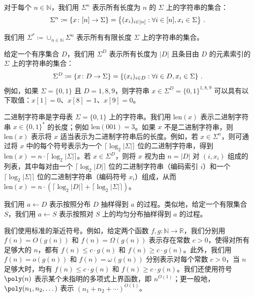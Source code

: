 \documentclass[american,singlepageview]{snargs-book-zh}
\renewcommand{\enspace}{\ensuremath{\thinspace}}
\newcommand{\Bits}{\{0,1\}}
\newcommand{\DefineEqual}{\coloneqq}
\newcommand{\ceil}[1]{\lceil{#1}\rceil}
\newcommand{\Cardinality}[1]{\left|{#1}\right|}
\newcommand{\BitSize}[1]{\mathrm{len}(#1)}
\newcommand{\Naturals}{\mathbb{N}}
\newcommand{\Reals}{\mathbb{R}}
\newcommand{\ProtoAlphabet}{\Sigma}
\begin{document}
对于每个 $n \in \Naturals$，我们用 $\ProtoAlphabet^{n}$ 表示所有长度为 $n$ 的 $\ProtoAlphabet$ 上的字符串的集合：
\begin{equation*}
\ProtoAlphabet^{n}
\DefineEqual
\left\{
x \colon [n] \to \ProtoAlphabet
\right\}
=
\left\{
(x_{i})_{i \in [n]} : \forall i \in [n], x_{i} \in \ProtoAlphabet
\right\}
\enspace.
\end{equation*}

我们用 $\ProtoAlphabet^{*} \DefineEqual \cup_{n \in \Naturals} \ProtoAlphabet^{n}$ 表示所有有限长度 $\ProtoAlphabet$ 上的字符串的集合。

给定一个有序集合 $D$，我们用 $\ProtoAlphabet^{D}$ 表示所有长度为 $\Cardinality{D}$ 且条目由 $D$ 的元素索引的 $\ProtoAlphabet$ 上的字符串的集合：
\begin{equation*}
\ProtoAlphabet^{D}
\DefineEqual
\left\{
x \colon D \to \ProtoAlphabet
\right\}
=
\left\{
(x_{i})_{i \in D} : \forall i \in D, x_{i} \in \ProtoAlphabet
\right\}
\enspace.
\end{equation*}
例如，如果 $\ProtoAlphabet = \Bits$ 且 $D = {1,8,9}$，则字符串 $x \in \ProtoAlphabet^{D}=\Bits^{{1,8,9}}$ 可以具有以下取值：$x[1]=0$、$x[8]=1$、$x[9]=0$。

二进制字符串是字母表 $\ProtoAlphabet=\Bits$ 上的字符串。我们用 $\BitSize{x}$ 表示二进制字符串 $x\in\Bits^{*}$ 的长度；例如 $\BitSize{001}=3$。如果 $x$ 不是二进制字符串，则 $\BitSize{x}$ 表示将 $x$ 适当表示为二进制字符串后的长度。例如，若 $x\in\ProtoAlphabet^{n}$，则可通过将 $x$ 中的每个符号表示为一个 $\ceil{\log_{2}\Cardinality{\ProtoAlphabet}}$ 位的二进制字符串，得到 $\BitSize{x} = n \cdot \ceil{\log_{2}\Cardinality{\ProtoAlphabet}}$。若 $x\in\ProtoAlphabet^{D}$，则将 $x$ 视为由 $n=\Cardinality{D}$ 对 $(i,x_{i})$ 组成的列表，其中每对由一个 $\ceil{\log_{2}\Cardinality{D}}$ 位的二进制字符串（编码索引 $i$）和一个 $\ceil{\log_{2}\Cardinality{\ProtoAlphabet}}$ 位的二进制字符串（编码符号 $x_{i}$）组成，从而 $\BitSize{x} = n \cdot (\ceil{\log_{2}\Cardinality{D}} + \ceil{\log_{2}\Cardinality{\ProtoAlphabet}})$。

我们用 $a \gets D$ 表示按照分布 $D$ 抽样得到 $a$ 的过程。类似地，给定一个有限集合 $S$，我们用 $a \gets S$ 表示按照对 $S$ 上的均匀分布抽样得到 $a$ 的过程。

我们使用标准的渐近符号。例如，给定两个函数 $f,g \colon \Naturals \to \Reals$，我们分别用 $f(n)=O(g(n))$ 和 $f(n)=\Omega(g(n))$ 表示存在常数 $c>0$，使得对所有足够大的 $n$，都有 $f(n)\le c\cdot g(n)$ 和 $f(n)\ge c\cdot g(n)$。此外，我们用 $f(n)=o(g(n))$ 和 $f(n)=\omega(g(n))$ 分别表示对每个常数 $c>0$，当 $n$ 足够大时，均有 $f(n)\le c\cdot g(n)$ 和 $f(n)\ge c\cdot g(n)$。我们还使用符号 $\poly(n)$ 表示某个未指明的多项式上界函数，即 $n^{O(1)}$；更一般地，$\poly(n_{1},n_{2},\dots)$ 表示 $(n_{1}+n_{2}+\cdots)^{O(1)}$。
\end{document}
